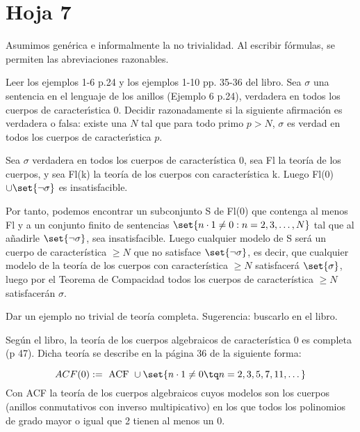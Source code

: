 \section{Hoja 7}

Asumimos genérica e informalmente la no trivialidad. Al escribir fórmulas, se permiten
las abreviaciones razonables.

\begin{problem}
Leer los ejemplos 1-6 p.24 y los ejemplos 1-10  pp. 35-36 del libro. Sea $\sigma$
una sentencia en el lenguaje de los anillos (Ejemplo 6 p.24), verdadera en todos los
cuerpos de caracter\'{\i}stica 0. Decidir razonadamente si la siguiente afirmaci\'on
es verdadera o falsa: existe una $N$ tal que para todo primo $p > N$, $\sigma$ es verdad
en todos los cuerpos de caracter\'{\i}stica $p$.
\solution


Sea $\sigma$ verdadera en todos los cuerpos de característica 0, sea Fl la teoría de los cuerpos, y sea Fl(k) la teoría de los cuerpos con característica k. Luego Fl(0) $\cup \set{\neg \sigma}$ es insatisfacible.

Por tanto, podemos encontrar un subconjunto S de Fl(0) que contenga al menos Fl y a un conjunto finito de sentencias $\set{n \cdot 1 \neq 0 : n=2,3,\dots, N}$ tal que al añadirle $\set{\neg \sigma}$, sea insatisfacible. Luego cualquier modelo de S será un cuerpo de característica $\geq N$ que no satisface $\set{\neg \sigma}$, es decir, que cualquier modelo de la teoría de los cuerpos con característica $\geq N$ satisfacerá $\set{ \sigma}$, luego por el Teorema de Compacidad todos los cuerpos de característica $\geq N$ satisfacerán $\sigma$.

\end{problem}

\begin{problem}
Dar un ejemplo no trivial de teoría completa. Sugerencia: buscarlo en el libro.
\solution

Según el libro, la teoría de los cuerpos algebraicos de característica 0 es completa (p 47).
Dicha teoría se describe en la página 36 de la siguiente forma:

\[ ACF(0) := \text{ ACF } \cup \set{n \cdot 1 \neq 0 \tq n = 2,3,5,7,11, \dots} \]
Con ACF la teoría de los cuerpos algebraicos cuyos modelos son los cuerpos (anillos conmutativos con inverso multipicativo) en los que todos los polinomios de grado mayor o igual que 2 tienen al menos un 0.
\end{problem}

